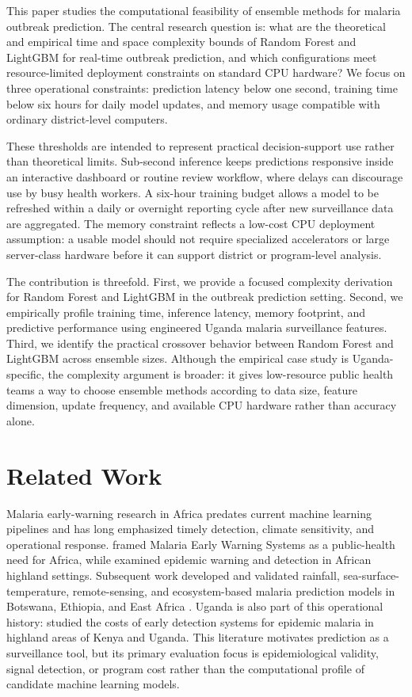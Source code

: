 \documentclass[11pt]{article}
\begin{document}
This paper studies the computational feasibility of ensemble methods for malaria outbreak prediction. The central research question is: what are the theoretical and empirical time and space complexity bounds of Random Forest and LightGBM for real-time outbreak prediction, and which configurations meet resource-limited deployment constraints on standard CPU hardware? We focus on three operational constraints: prediction latency below one second, training time below six hours for daily model updates, and memory usage compatible with ordinary district-level computers.

These thresholds are intended to represent practical decision-support use rather than theoretical limits. Sub-second inference keeps predictions responsive inside an interactive dashboard or routine review workflow, where delays can discourage use by busy health workers. A six-hour training budget allows a model to be refreshed within a daily or overnight reporting cycle after new surveillance data are aggregated. The memory constraint reflects a low-cost CPU deployment assumption: a usable model should not require specialized accelerators or large server-class hardware before it can support district or program-level analysis.

The contribution is threefold. First, we provide a focused complexity derivation for Random Forest and LightGBM in the outbreak prediction setting. Second, we empirically profile training time, inference latency, memory footprint, and predictive performance using engineered Uganda malaria surveillance features. Third, we identify the practical crossover behavior between Random Forest and LightGBM across ensemble sizes. Although the empirical case study is Uganda-specific, the complexity argument is broader: it gives low-resource public health teams a way to choose ensemble methods according to data size, feature dimension, update frequency, and available CPU hardware rather than accuracy alone.

\section{Related Work}
Malaria early-warning research in Africa predates current machine learning pipelines and has long emphasized timely detection, climate sensitivity, and operational response. \citet{thomson2001malaria} framed Malaria Early Warning Systems as a public-health need for Africa, while \citet{abeku2004highlands} examined epidemic warning and detection in African highland settings. Subsequent work developed and validated rainfall, sea-surface-temperature, remote-sensing, and ecosystem-based malaria prediction models in Botswana, Ethiopia, and East Africa \citep{thomson2005botswana,midekisa2012remote,githeko2014eastafrica}. Uganda is also part of this operational history: \citet{mueller2009costs} studied the costs of early detection systems for epidemic malaria in highland areas of Kenya and Uganda. This literature motivates prediction as a surveillance tool, but its primary evaluation focus is epidemiological validity, signal detection, or program cost rather than the computational profile of candidate machine learning models.
\end{document}
